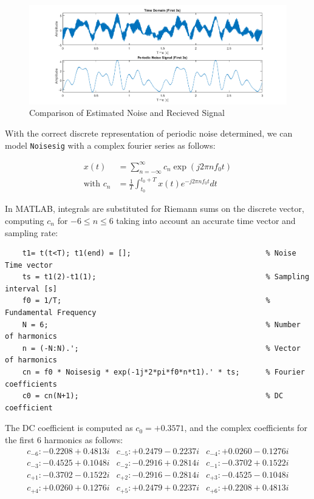 \documentclass[12pt]{article}
\begin{document}
\begin{figure}[ht]
    \centering
    \includegraphics{figures/p2-noisecomp.png}
    \caption{Comparison of Estimated Noise and Recieved Signal\label{fig:p2-noisecomp}}
\end{figure}

With the correct discrete representation of periodic noise determined, we can
model \verb+Noisesig+ with a complex fourier series as follows:

\begin{align*}
    x(t)             & = \sum_{n=-\infty}^{\infty} c_n \exp(j 2\pi n f_0 t)        \\
    \text{with } c_n & = \frac{1}{T} \int^{t_0 + T}_{t_0} x(t)e^{-j2\pi nf_0 t} dt
\end{align*}

In MATLAB, integrals are substituted for Riemann sums on the discrete vector,
computing $c_n$ for $-6\le n \le 6$ taking into account an accurate time vector
and sampling rate:

\begin{verbatim}
    t1= t(t<T); t1(end) = [];                               % Noise Time vector 
    ts = t1(2)-t1(1);                                       % Sampling interval [s]
    f0 = 1/T;                                               % Fundamental Frequency
    N = 6;                                                  % Number of harmonics
    n = (-N:N).';                                           % Vector of harmonics
    cn = f0 * Noisesig * exp(-1j*2*pi*f0*n*t1).' * ts;      % Fourier coefficients
    c0 = cn(N+1);                                           % DC coefficient
\end{verbatim}

The DC coefficient is computed as $c_0 = +0.3571$, and the complex coefficients
for the first 6 harmonics as follows:
\[
    \begin{array}{ccc}
        c_{-6} : -0.2208 + 0.4813i & c_{-5} : +0.2479 - 0.2237i & c_{-4} : +0.0260 - 0.1276i \\
        c_{-3} : -0.4525 + 0.1048i & c_{-2} : -0.2916 + 0.2814i & c_{-1} : -0.3702 + 0.1522i \\
        c_{+1} : -0.3702 - 0.1522i & c_{+2} : -0.2916 - 0.2814i & c_{+3} : -0.4525 - 0.1048i \\
        c_{+4} : +0.0260 + 0.1276i & c_{+5} : +0.2479 + 0.2237i & c_{+6} : +0.2208 + 0.4813i \\
    \end{array}
\]
\end{document}
